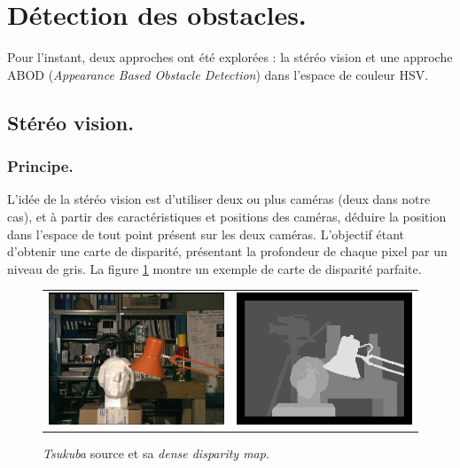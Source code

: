 \documentclass{article}
\begin{document}
\section{Détection des obstacles.}
Pour l'instant, deux approches ont été explorées : la stéréo vision et une approche ABOD (\emph{Appearance Based Obstacle Detection}) dans l'espace de couleur HSV.

\subsection{Stéréo vision.}
\subsubsection{Principe.} L'idée de la stéréo vision est d'utiliser deux ou plus caméras (deux dans notre cas), et à partir des caractéristiques et positions des caméras, déduire la position dans l'espace de tout point présent sur les deux caméras. L'objectif étant d'obtenir une carte de disparité, présentant la profondeur de chaque pixel par un niveau de gris. La figure \ref{disparity} montre un exemple de carte de disparité parfaite.

\begin{figure}
    \begin{center}
        \begin{tabular}{cc}
            \includegraphics[width=0.4\linewidth]{rcs/tsukuba.png} & \includegraphics[width=0.4\linewidth]{rcs/tsukuba_disp.png} \\
        \end{tabular}
    \end{center}
    \caption{\emph{Tsukuba} source et sa \emph{dense disparity map}.}
    \label{disparity}
\end{figure}
\end{document}

